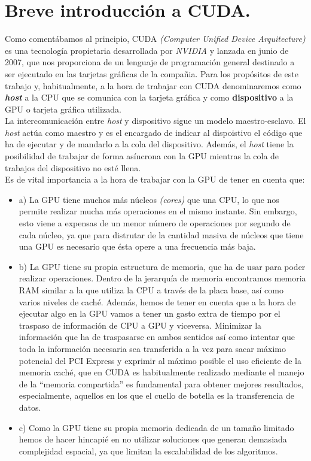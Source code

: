 \section{Breve introducción a CUDA.}
Como comentábamos al principio, CUDA \textit{(Computer Unified Device Arquitecture)} \cite{cuda} es una tecnología propietaria desarrollada por \textit{NVIDIA} y lanzada en junio de 2007, que nos proporciona de un lenguaje de programación general destinado a ser ejecutado en las tarjetas gráficas de la compañia. Para los propósitos de este trabajo y, habitualmente, a la hora de trabajar con CUDA denominaremos como \textbf{\textit{host}} a la CPU que se comunica con la tarjeta gráfica y como \textbf{dispositivo} a la GPU o tarjeta gráfica utilizada. \\

La intercomunicación entre \textit{host} y dispositivo sigue un modelo maestro-esclavo. El \textit{host} actúa como maestro y es el encargado de indicar al dispoistivo el código que ha de ejecutar y de mandarlo a la cola del dispositivo. Además, el \textit{host} tiene la posibilidad de trabajar de forma asíncrona con la GPU mientras la cola de trabajos del dispositivo no esté llena. \\

Es de vital importancia a la hora de trabajar con la GPU de tener en cuenta que:\\
\begin{itemize}
    \item a) La GPU tiene muchos más núcleos \textit{(cores)} que una CPU, lo que nos permite realizar mucha más operaciones en el mismo instante. Sin embargo, esto viene a expensas de un menor número de operaciones por segundo de cada núcleo, ya que para distrutar de la cantidad masiva de núcleos que tiene una GPU es necesario que ésta opere a una frecuencia más baja.

    \item b) La GPU tiene su propia estructura de memoria, que ha de usar para poder realizar operaciones. Dentro de la jerarquía de memoria encontramos memoria RAM similar a la que utiliza la CPU a través de la placa base, así como varios niveles de caché. Además, hemos de tener en cuenta que a la hora de ejecutar algo en la GPU vamos a tener un gasto extra de tiempo por el traspaso de información de CPU a GPU y viceversa. Minimizar la información que ha de traspasarse en ambos sentidos así como intentar que toda la información necesaria sea transferida a la vez para sacar máximo potencial del PCI Express y exprimir al máximo posible el uso eficiente de la memoria caché, que en CUDA es habitualmente realizado mediante el manejo de la ``memoria compartida'' es fundamental para obtener mejores resultados, especialmente, aquellos en los que el cuello de botella es la transferencia de datos.

    \item c) Como la GPU tiene su propia memoria dedicada de un tamaño limitado hemos de hacer hincapié en no utilizar soluciones que generan demasiada complejidad espacial, ya que limitan la escalabilidad de los algoritmos.
\end{itemize}

